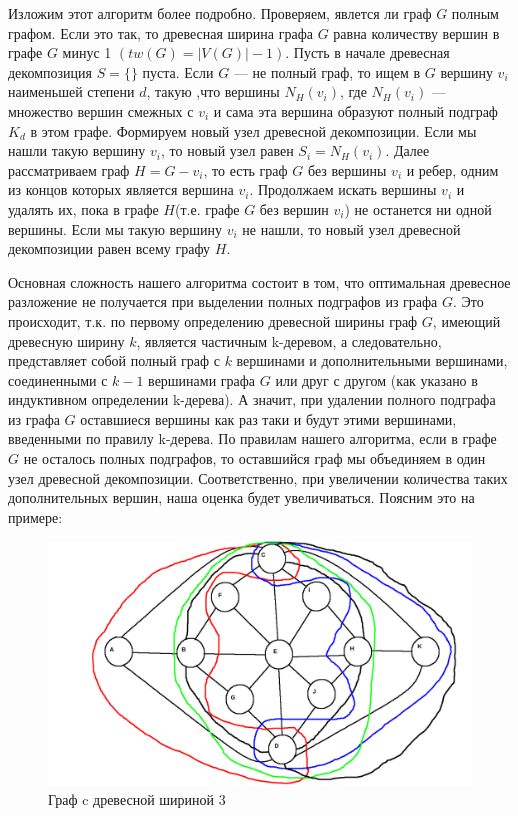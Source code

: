 \documentclass[a4paper,12pt]{article}
\begin{document}
\begin{large}
\begin{large}
		Изложим этот алгоритм более подробно. Проверяем, явлется ли граф $G$ полным графом. Если это так, то древесная ширина графа $G$ равна количеству вершин в графе $G$ минус 1 $(tw(G)=|V(G)| - 1)$.
		Пусть в начале древесная декомпозиция $S=\{\}$ пуста.
		Если $G$ --- не полный граф, то ищем в $G$ вершину $v_i$ наименьшей степени $d$, такую ,что вершины $N_H(v_i)$, где $N_H(v_i)$ --- множество вершин смежных с $v_i$ и сама эта вершина образуют полный подграф $K_d$ в этом графе.
		Формируем новый узел древесной декомпозиции. Если мы нашли такую вершину $v_i$, то новый узел равен $S_i = N_H(v_i)$.
		Далее рассматриваем граф $H=G - v_i$, то есть граф $G$ без вершины $v_i$ и ребер, одним из концов которых является вершина $v_i$.
		Продолжаем искать вершины $v_i$ и удалять их, пока в графе $H$(т.е. графе $G$ без вершин $v_i$) не останется ни одной вершины.
		Если мы такую вершину $v_i$ не нашли, то новый узел древесной декомпозиции равен всему графу $H$.

		Основная сложность нашего алгоритма состоит в том, что оптимальная древесное разложение не получается при выделении полных подграфов из графа $G$.
		Это происходит, т.к. по первому определению древесной ширины граф $G$, имеющий древесную ширину $k$, является частичным k-деревом, а следовательно, представляет собой полный граф с $k$ вершинами и дополнительными вершинами, соединенными с $k - 1$ вершинами графа $G$ или друг с другом (как указано в индуктивном определении k-дерева).
		А значит, при удалении полного подграфа из графа $G$ оставшиеся вершины как раз таки и будут этими вершинами, введенными по правилу k-дерева.
		По правилам нашего алгоритма, если в графе $G$ не осталось полных подграфов, то оставшийся граф мы объединяем в один узел древесной декомпозиции.
		Соответственно, при увеличении количества таких дополнительных вершин, наша оценка будет увеличиваться.
		Поясним это на примере:

		\begin{figure}[htbp]
			\centering
				\includegraphics[scale=0.4]{graph_decomp.png}
				\caption{Граф c древесной шириной 3}
				\label{fig:testImage}
		\end{figure}


\end{large}
\end{large}
\end{document}
